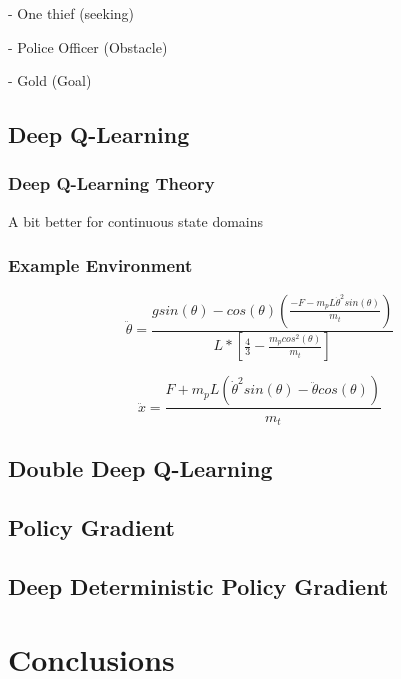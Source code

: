 \documentclass{jfm}
\begin{document}
- One thief (seeking)

- Police Officer (Obstacle)

- Gold (Goal)


\subsection{Deep Q-Learning}
\subsubsection{Deep Q-Learning Theory}
A bit better for continuous state domains

\subsubsection{Example Environment}
\cite{Florian2007}

\cite{1606.01540}

\begin{equation}
\ddot{\theta} = \frac{g sin(\theta) - cos(\theta) \left(\frac{-F - m_{p} L \dot{\theta}^2 sin(\theta)}{m_{t}}\right)}{L * \left[\frac{4}{3} - \frac{m_{p} cos^2(\theta)}{m_{t}}\right]}
\end{equation}

\begin{equation}
\ddot{x} = \frac{F + m_{p}L\left(\dot{\theta}^2 sin(\theta) - \ddot{\theta} cos(\theta) \right)}{m_{t}}
\end{equation}


\subsection{Double Deep Q-Learning}

\subsection{Policy Gradient}

\subsection{Deep Deterministic Policy Gradient}

\section{Conclusions}




\end{document}
